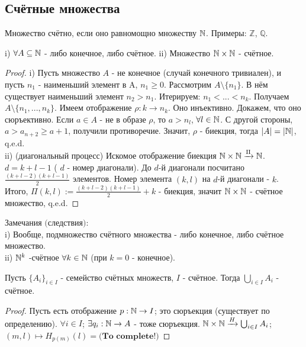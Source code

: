 \subsection{Счётные множества}
\begin{definition}
	Множество счётно, если оно равномощно множеству $ \mathbb{N} $. Примеры: $ \mathbb{Z} $, $ \mathbb{Q} $.
\end{definition}
\begin{proposition}
	i) $ \forall A \subseteq \mathbb{N} $ - либо конечное, либо счётное.
	ii) Множество $ \mathbb{N} \times \mathbb{N} $ - счётное.
\end{proposition}
\begin{proof}
	i) Пусть множество $ A $ - не конечное (случай конечного тривиален), и пусть $ n_1 $ - наименьший элемент в A, $ n_1 \geq 0 $. 
	Рассмотрим $ A \setminus \{n_1\} $. В нём существует наименьший элемент $ n_2 > n_1 $. 
	Итерируем: $ n_1 < ... < n_k $. Получаем $ A \setminus \{n_1, ..., n_k\} $. Имеем отображение $ \rho: k \to n_k $. 
	Оно инъективно. Докажем, что оно сюръективно. Если $ a \in A $ - не в образе $ \rho $, то $ a > n_l$, $ \forall l \in \mathbb{N} $. 
	С другой стороны, $ a > a_{n+2} \geq a + 1 $, получили противоречие. 
	Значит, $ \rho $ - биекция, тогда $ |A| = |\mathbb{N}| $, q.e.d. \\
	ii) ($ \textit{диагональный процесс} $) Искомое отображение биекция $ \mathbb{N} \times \mathbb{N} \xrightarrow{\Pi} \mathbb{N} $. $ d = k + l - 1 $ ( $ d $ - номер диагонали). 
	До $ d $-й диагонали посчитано $ \frac{(k + l - 2)(k + l - 1)}{2} $ элементов. Номер элемента $ (k, l) $ на $ d $-й диагонали - $ k $. 
	Итого, $ \Pi(k, l) := \frac{(k + l - 2)(k + l - 1)}{2} + k $ - биекция, значит $ \mathbb{N} \times \mathbb{N} $ - счётное множество, q.e.d. 
\end{proof}
$ \textit{Замечания (следствия):} $ \\ i) Вообще, подмножество счётного множества - либо конечное, либо счётное множество. \\
ii) $ \mathbb{N}^k $ -счётное $ \forall k \in \mathbb{N} $ (при $ k = 0 $ - конечное).
\begin{proposition}
	Пусть $ \{A_i\}_{i\in I} $ - семейство счётных множеств, $ I $ - счётное. Тогда $ \bigcup_{i \in I} A_i $ - счётное.
\end{proposition}
\begin{proof}
	Пусть есть отображение $ p: \mathbb{N} \to I $; это сюръекция (существует по определению). $ \forall i \in I $; $ \exists q_i: \mathbb{N} \to A $ - тоже сюръекция.
	$ \mathbb{N} \times \mathbb{N} \xrightarrow{H} \bigcup_{i \in I} A_i $; $ (m, l) \mapsto H_{p(m)}(l) =  \textbf{(To complete!)} $
\end{proof}

